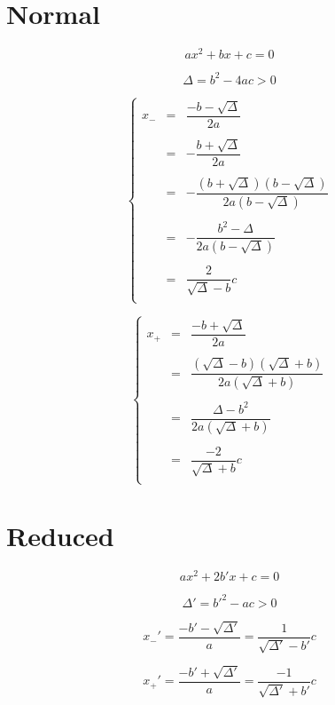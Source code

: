 \documentclass[aps,12pt]{revtex4}
\begin{document}
\section{Normal}

$$ax^2+bx+c=0$$

$$
\Delta = b^2-4ac > 0
$$	

$$
\left\lbrace
\begin{array}{rcl}
	x_- & = &  \dfrac{-b-\sqrt{\Delta}}{2a} \\
	\\
	& = & -  \dfrac{b+\sqrt{\Delta}}{2a} \\
	\\
	& = & -  \dfrac{(b+\sqrt{\Delta})(b-\sqrt{\Delta})}{2a(b-\sqrt{\Delta})}\\
	\\
	& = & - \dfrac{b^2-\Delta}{2a(b-\sqrt{\Delta})}\\
	\\
	& = & \dfrac{2}{\sqrt{\Delta}-b} c\\ 
\end{array}
\right.
$$

$$
\left\lbrace
\begin{array}{rcl}
	x_+ & = &  \dfrac{-b+\sqrt{\Delta}}{2a} \\
	\\
	 & = & \dfrac{(\sqrt{\Delta}-b)(\sqrt{\Delta}+b)}{2a(\sqrt{\Delta}+b)}\\
	\\
	& = & \dfrac{\Delta-b^2}{2a(\sqrt{\Delta}+b)}\\
	\\
	& = & \dfrac{-2}{\sqrt{\Delta}+b}c\\
\end{array}
\right.
$$


\section{Reduced}

$$ax^2+2b'x+c=0$$

$$
\Delta' = b'^2-ac > 0
$$	

$$
	x_-' = \dfrac{-b'-\sqrt{\Delta'}}{a} = \dfrac{1}{\sqrt{\Delta'}-b'}{c}
$$

$$
	x_+' = \dfrac{-b'+\sqrt{\Delta'}}{a} = \dfrac{-1}{\sqrt{\Delta'}+b'}{c}
$$
\end{document}
